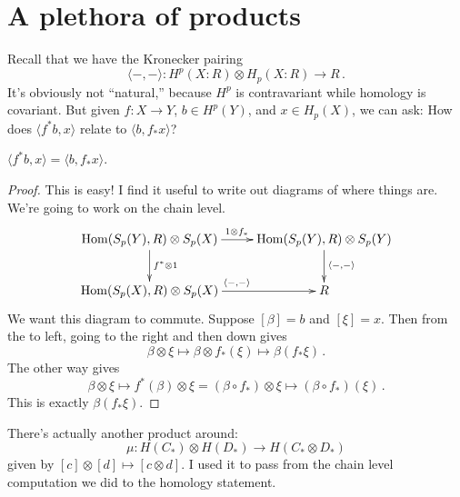 \section{A plethora of products}

Recall that we have the Kronecker pairing 
\[
\langle-,-\rangle: H^p(X:R)\otimes H_p(X:R)\to R\,.
\]
It's obviously not ``natural,'' because $ H^p$ is contravariant while homology is covariant. But given $f:X\to Y$, $b\in H^p(Y)$, and $x\in H_p(X)$, we can ask: How does $\langle f^\ast b,x\rangle$ relate to $\langle b,f_\ast x\rangle$?
\begin{claim}
$\langle f^\ast b,x\rangle=\langle b,f_\ast x\rangle$.
\end{claim}
\begin{proof}
This is easy! I find it useful to write out diagrams of where things are. We're going to work on the chain level.
\begin{equation*}
	\xymatrix{
\Hom(S_p(Y),R)\otimes S_p(X)\ar[r]^{1\otimes f_\ast}\ar[d]^{f^\ast\otimes 1} & 
\Hom(S_p(Y),R)\otimes S_p(Y)\ar[d]^{\langle-,-\rangle} \\
\Hom(S_p(X),R)\otimes S_p(X)\ar[r]^{\langle-,-\rangle} & R
	}
\end{equation*}
We want this diagram to commute. Suppose $[\beta]=b$ and $[\xi]=x$. Then from the to left, going to the right and then down gives 
\[
\beta\otimes\xi\mapsto\beta\otimes f_\ast(\xi)\mapsto\beta(f_\ast\xi)\,.
\]
The other way gives 
\[
\beta\otimes\xi\mapsto f^\ast(\beta)\otimes\xi=(\beta\circ f_*)\otimes\xi\mapsto(\beta\circ f_*)(\xi)\,.
\]
This is exactly $\beta(f_\ast\xi)$.
\end{proof}
There's actually another product around: 
\[
\mu:H(C_\ast)\otimes H(D_\ast)\to H(C_\ast\otimes D_\ast)
\]
given by $[c]\otimes [d]\mapsto[c\otimes d]$. I used it to pass from the 
chain level computation we did to the homology statement.

